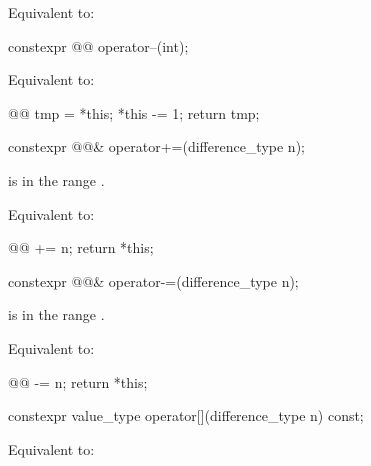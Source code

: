 \begin{itemdescr}
\pnum
\effects
Equivalent to: 
\end{itemdescr}

\begin{itemdecl}
constexpr @@ operator--(int);
\end{itemdecl}

\begin{itemdescr}
\pnum
\effects
Equivalent to:
\begin{codeblock}
@@ tmp = *this;
*this -= 1;
return tmp;
\end{codeblock}
\end{itemdescr}

\begin{itemdecl}
constexpr @@& operator+=(difference_type n);
\end{itemdecl}

\begin{itemdescr}
\pnum
\expects
{} is in the range .

\pnum
\effects
Equivalent to:
\begin{codeblock}
@@ += n;
return *this;
\end{codeblock}
\end{itemdescr}

\begin{itemdecl}
constexpr @@& operator-=(difference_type n);
\end{itemdecl}

\begin{itemdescr}
\pnum
\expects
{} is in the range .

\pnum
\effects
Equivalent to:
\begin{codeblock}
@@ -= n;
return *this;
\end{codeblock}
\end{itemdescr}

\begin{itemdecl}
constexpr value_type operator[](difference_type n) const;
\end{itemdecl}

\begin{itemdescr}
\pnum
\effects
Equivalent to: 
\end{itemdescr}


